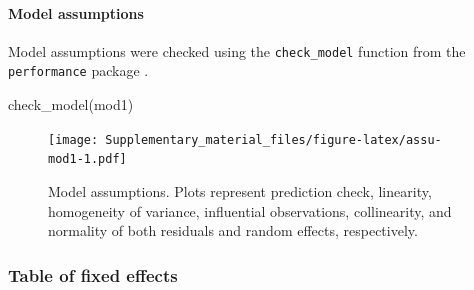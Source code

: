 \documentclass[
  bookmarksnumbered]{article}
\newenvironment{Shaded}{\begin{snugshade}}{\end{snugshade}}
\newcommand{\AttributeTok}[1]{\textcolor[rgb]{0.80,0.80,0.80}{#1}}
\newcommand{\FunctionTok}[1]{\textcolor[rgb]{0.94,0.94,0.56}{#1}}
\newcommand{\NormalTok}[1]{\textcolor[rgb]{0.80,0.80,0.80}{#1}}
\newcommand{\OtherTok}[1]{\textcolor[rgb]{0.94,0.94,0.56}{#1}}
\newcommand{\SpecialCharTok}[1]{\textcolor[rgb]{0.86,0.64,0.64}{#1}}
\begin{document}
\paragraph{Model assumptions}\label{model-assumptions}

Model assumptions were checked using the \texttt{check\_model} function from the \texttt{performance} package \autocite{ludecke2021}.

\begin{Shaded}
\begin{Highlighting}[]
\FunctionTok{check\_model}\NormalTok{(mod1)}
\end{Highlighting}
\end{Shaded}

\begin{figure}
\centering
\texttt{[image: Supplementary\_material\_files/figure-latex/assu-mod1-1.pdf]}
\caption{\label{fig:assu-mod1}Model assumptions. Plots represent prediction check, linearity, homogeneity of variance, influential observations, collinearity, and normality of both residuals and random effects, respectively.}
\end{figure}

\subsubsection{Table of fixed effects}\label{table-of-fixed-effects}

\begin{Shaded}
\end{Shaded}
\end{document}
